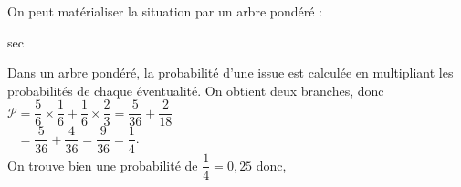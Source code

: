    On peut matérialiser la situation par un arbre pondéré : \\ [5mm]
\begin{minipage}{8cm}
\textcolor{B2}{sec}
\end{minipage}
\begin{minipage}{8cm}
 Dans un arbre pondéré, la probabilité d'une issue est calculée en multipliant les probabilités de chaque éventualité. On obtient deux branches, donc \\ [1mm]
$\mathcal{P} =\dfrac56\times\dfrac16+\dfrac16\times\dfrac23 =\dfrac{5}{36}+\dfrac{2}{18}$ \\ [1mm]
 $\phantom{\mathcal{P}} =\dfrac{5}{36}+\dfrac{4}{36} =\dfrac{9}{36} =\dfrac14$. \\ [5mm]
   On trouve bien une probabilité de $\dfrac14 =0,25$ donc, \\
\end{minipage}
